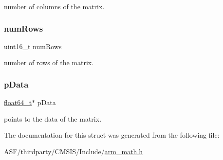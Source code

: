 number of columns of the matrix. \mbox{\label{structarm__matrix__instance__f64_a1bcf80ccdc2acc29198f1592ae300390}} 
\subsubsection{\texorpdfstring{numRows}{numRows}}
{\footnotesize\ttfamily uint16\+\_\+t num\+Rows}

number of rows of the matrix. \mbox{\label{structarm__matrix__instance__f64_aa7a4c9839c31e933360ef3a3167b9877}} 
\subsubsection{\texorpdfstring{pData}{pData}}
{\footnotesize\ttfamily \mbox{\hyperlink{arm__math_8h_ac55f3ae81b5bc9053760baacf57e47f4}{float64\+\_\+t}}$\ast$ p\+Data}

points to the data of the matrix. 

The documentation for this struct was generated from the following file\+:\begin{DoxyCompactItemize}
\item 
A\+S\+F/thirdparty/\+C\+M\+S\+I\+S/\+Include/\mbox{\hyperlink{arm__math_8h}{arm\+\_\+math.\+h}}\end{DoxyCompactItemize}
